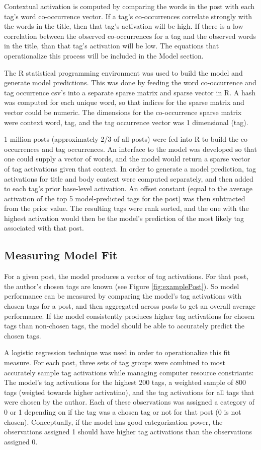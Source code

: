 \documentclass[10pt,letterpaper]{article}
\begin{document}
Contextual activation is computed by comparing the words in the post with each tag's word co-occurrence vector.
If a tag's co-occurrences correlate strongly with the words in the title, then that tag's activation will be high.
If there is a low correlation between the observed co-occurrences for a tag and the observed words in the title, than that tag's activation will be low.
The equations that operationalize this process will be included in the Model section.

The R statistical programming environment was used to build the model and generate model predictions.
This was done by feeding the word co-occurrence and tag occurrence csv's into a separate sparse matrix and sparse vector in R.
A hash was computed for each unique word, so that indices for the sparse matrix and vector could be numeric.
The dimensions for the co-occurrence sparse matrix were context word, tag, and the tag occurrence vector was 1 dimensional (tag).

1 million posts (approximately 2/3 of all posts) were fed into R to build the co-occurrences and tag occurrences.
An interface to the model was developed so that one could supply a vector of words, and the model would return a sparse vector of tag activations given that context.
In order to generate a model prediction, tag activations for title and body context were computed separately, and then added to each tag's prior base-level activation.
An offset constant (equal to the average activation of the top 5 model-predicted tags for the post) was then subtracted from the prior value.
The resulting tags were rank sorted, and the one with the highest activation would then be the model's prediction of the most likely tag associated with that post.

\subsection{Measuring Model Fit}

For a given post, the model produces a vector of tag activations.
For that post, the author's chosen tags are known (see Figure \ref{fig:examplePost}).
So model performance can be measured by comparing the model's tag activations with chosen tags for a post, and then aggregated across posts to get an overall average performance.
If the model consistently produces higher tag activations for chosen tags than non-chosen tags, the model should be able to accurately predict the chosen tags.

A logistic regression technique was used in order to operationalize this fit measure.
For each post, three sets of tag groups were combined to most accurately sample tag activations while managing computer resource constriants:
The model's tag activations for the highest 200 tags, a weighted sample of 800 tags (weigted towards higher activatino), and the tag activations for all tags that were chosen by the author.
Each of these observations was assigned a category of 0 or 1 depending on if the tag was a chosen tag or not for that post (0 is not chosen).
Conceptually, if the model has good categorization power, the observations assigned 1 should have higher tag activations than the observations assigned 0.
\end{document}
